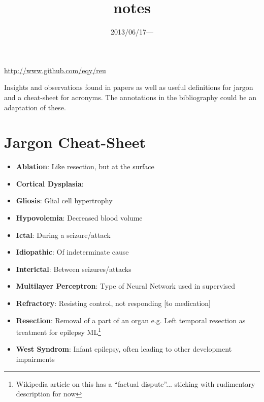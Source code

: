 \documentclass{article}
\title{\vspace{-3ex}notes}
\date{2013/06/17---}
\begin{document}
\maketitle
\url{http://www.github.com/eqy/reu}

Insights and observations found in papers as well as useful definitions for
jargon and a cheat-sheet for acronyms. The annotations in the bibliography could
be an adaptation of these.

\section{Jargon Cheat-Sheet}
\begin{itemize}
\item \textbf{Ablation}: Like resection, but at the surface
\item \textbf{Cortical Dysplasia}: 
\item \textbf{Gliosis}: Glial cell hypertrophy
\item \textbf{Hypovolemia}: Decreased blood volume
\item \textbf{Ictal}: During a seizure/attack
\item \textbf{Idiopathic}: Of indeterminate cause
\item \textbf{Interictal}: Between seizures/attacks
\item \textbf{Multilayer Perceptron}: Type of Neural Network used in supervised
\item \textbf{Refractory}: Resisting control, not responding [to medication] 
\item \textbf{Resection}: Removal of a part of an organ e.g. Left temporal
resection as treatment for epilepsy
ML\footnote{Wikipedia article on this has a ``factual dispute''... sticking with
rudimentary description for now}
\item \textbf{West Syndrom}: Infant epilepsy, often leading to other development
impairments
\end{itemize}
\end{document}
